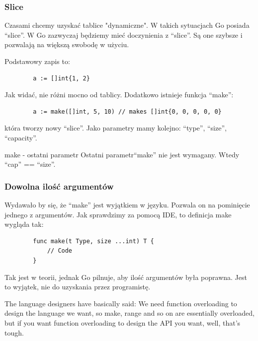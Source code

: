 \documentclass[10pt]{beamer}
\newcommand{\quotes}[1]{``#1''}
\begin{document}
\begin{frame}[fragile]
    \frametitle{Slice}
    Czasami chcemy uzyskać tablice "dynamiczne". W takich sytuacjach Go posiada \quotes{slice}.
    W Go zazwyczaj będziemy mieć doczynienia z \quotes{slice}. Są one szybsze i pozwalają na większą
    swobodę w użyciu.

    Podstawowy zapis to:
    \begin{verbatim}
        a := []int{1, 2}
    \end{verbatim}

    Jak widać, nie różni mocno od tablicy. Dodatkowo istnieje funkcja \quotes{make}:
    \begin{verbatim}
        a := make([]int, 5, 10) // makes []int{0, 0, 0, 0, 0}
    \end{verbatim}
    która tworzy nowy \quotes{slice}. Jako parametry mamy kolejno: \quotes{type}, \quotes{size}, \quotes{capacity}.

    \begin{block}{make - ostatni parametr}
        Ostatni parametr\quotes{make} nie jest wymagany. Wtedy \quotes{cap} == \quotes{size}.
    \end{block}
\end{frame}

\begin{frame}[fragile]
    \frametitle{Dowolna ilość argumentów}
    Wydawało by się, że \quotes{make} jest wyjątkiem w języku. Pozwala on na pominięcie
    jednego z argumentów. Jak sprawdzimy za pomocą IDE, to definicja make wygląda
    tak:

    \begin{verbatim}
        func make(t Type, size ...int) T {
            // Code
        }
    \end{verbatim}

    Tak jest w teorii, jednak Go pilnuje, aby ilość argumentów była poprawna.
    Jest to wyjątek, nie do uzyskania przez programistę.

    \begin{block}{The language designers have basically said:}
        We need function overloading to design the language we want, so make, range and so on are essentially overloaded, but if you want function overloading to design the API you want, well, that's tough.
    \end{block}
\end{frame}
\end{document}

